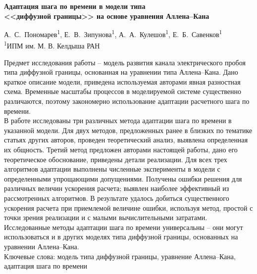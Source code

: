 \documentclass[a4paper,12pt]{article}
\theoremstyle{plain}
\theoremstyle{remark}
\newcommand{\PreprintTitle}{%
	Адаптация шага по времени в модели типа \\ <<диффузной границы>> на основе уравнения Аллена--Кана%
}
\newcommand{\PreprintAuthors}{%
	А.~С.~Пономарев\textsuperscript{1}, Е.~В.~Зипунова\textsuperscript{1}, А.~А.~Кулешов\textsuperscript{1}, Е.~Б.~Савенков\textsuperscript{1} \\
	\textsuperscript{1}ИПМ им. М. В. Келдыша РАН%
}
\begin{document}

{
	\centering
	{\large \textbf{\PreprintTitle} \par}
	\vspace{2mm}
	\PreprintAuthors \par
	\vspace{2mm}
}
{
	\noindent \small
	Предмет исследования работы -- модель развития канала электрического пробоя типа диффузной границы, основанная на уравнении типа Аллена--Кана. Дано краткое описание модели, приведена используемая авторами явная разностная схема. Временные масштабы процессов в моделируемой системе существенно различаются, поэтому закономерно использование адаптации расчетного шага по времени. \\
	В работе исследованы три различных метода адаптации шага по времени в указанной модели. Для двух методов, предложенных ранее в близких по тематике статьях других авторов, проведен теоретический анализ, выявлена определенная их общность. Третий метод предложен авторами настоящей работы, дано его теоретическое обоснование, приведены детали реализации. Для всех трех алгоритмов адаптации выполнены численные эксперименты в модели с определенными упрощающими допущениями. Получены ошибки решения для различных величин ускорения расчета; выявлен наиболее эффективный из рассмотренных алгоритмов. В результате удалось добиться существенного ускорения расчета при приемлемой величине ошибки, используя метод, простой с точки зрения реализации и с малыми вычислительными затратами. \\
	Исследованные методы адаптации шага по времени универсальны – они могут использоваться и в других моделях типа диффузной границы, основанных на уравнении Аллена–Кана. \\[2mm]
	Ключевые слова: модель типа диффузной границы, уравнение Аллена--Кана, адаптация шага по времени \par
	\vspace{5mm}
}
\end{document}
